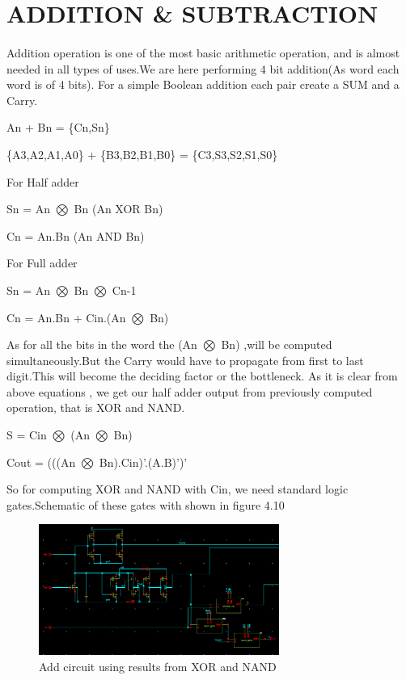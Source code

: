\section{ADDITION \& SUBTRACTION}
\paragraph{}

Addition operation is one of the most basic arithmetic operation, and is almost needed in all types of uses.We are here performing 4 bit addition(As word each word is of 4 bits). For a simple Boolean addition each pair create a SUM and a Carry.

    An + Bn = \{Cn,Sn\}
    
    \{A3,A2,A1,A0\} + \{B3,B2,B1,B0\}  = \{C3,S3,S2,S1,S0\} 

For Half adder

Sn = An $\bigotimes$ Bn  (An XOR Bn)

Cn = An.Bn   (An AND Bn)

For Full adder

Sn = An $\bigotimes$ Bn $\bigotimes$ Cn-1

Cn = An.Bn + Cin.(An $\bigotimes$ Bn)

As for all the bits in the word the (An $\bigotimes$  Bn) ,will be computed simultaneously.But the Carry would have to propagate from first to last digit.This will become the deciding factor or the bottleneck. As it is clear from above equations , we get our half adder output from previously computed operation, that is XOR and NAND.

S = Cin  $\bigotimes$ (An $\bigotimes$ Bn)

Cout = (((An $\bigotimes$ Bn).Cin)'.(A.B)')'

So for computing XOR and NAND with Cin, we need standard logic gates.Schematic of these gates with shown in figure 4.10 

\begin{figure}[h]
    \centering
    \includegraphics[width=0.7\textwidth]{add.png}
    \caption{Add circuit using results from XOR and NAND}
    \label{fig:mesh1}
\end{figure}

